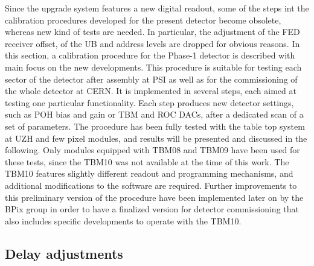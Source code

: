 Since the upgrade system features a new digital readout, some of the steps int the calibration procedures developed for the present detector become obsolete, whereas new kind of tests are needed.
In particular, the adjustment of the FED receiver offset, of the UB and address levels are dropped for obvious reasons.
In this section, a calibration procedure for the Phase-1 detector is described with main focus on the new developments.
This procedure is suitable for testing each sector of the detector after assembly at PSI as well as for the commissioning of the whole detector at CERN.
It is implemented in several steps, each aimed at testing one particular functionality. 
Each step produces new detector settings, such as POH bias and gain or TBM and ROC DACs, after a dedicated scan of a set of parameters.
The procedure has been fully tested with the table top system at UZH and few pixel modules, and results will be presented and discussed in the following.
Only modules equipped with TBM08 and TBM09 have been used for these tests,
since the TBM10 was not available at the time of this work.
The TBM10 features slightly different readout and programming mechanisms, and additional modifications to the software are required.
Further improvements to this preliminary version of the procedure have been implemented later on by the BPix group in order to have a finalized version for detector commissioning
that also includes specific developments to operate with the TBM10.

\subsection{Delay adjustments}\label{subsec:TBMPLLROCDelays}

